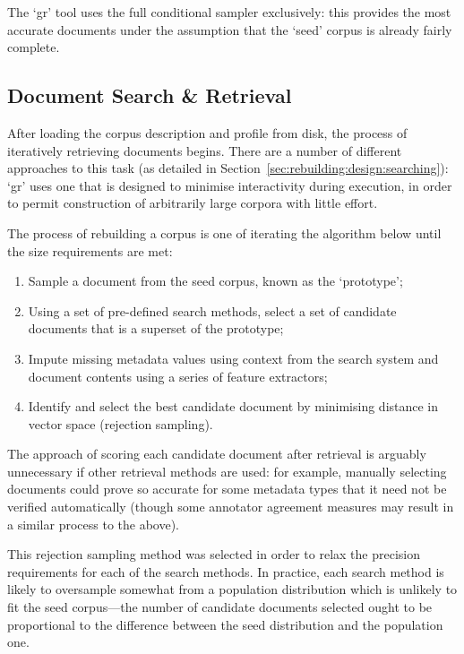 The `gr' tool uses the full conditional sampler exclusively: this provides the most accurate documents under the assumption that the `seed' corpus is already fairly complete.





\subsection{Document Search \& Retrieval}
After loading the corpus description and profile from disk, the process of iteratively retrieving documents begins.  There are a number of different approaches to this task (as detailed in Section~\ref{sec:rebuilding:design:searching}): `gr' uses one that is designed to minimise interactivity during execution, in order to permit construction of arbitrarily large corpora with little effort.

The process of rebuilding a corpus is one of iterating the algorithm below until the size requirements are met:

\begin{enumerate}
    \item Sample a document from the seed corpus, known as the `prototype';
    \item Using a set of pre-defined search methods, select a set of candidate documents that is a superset of the prototype;
    \item Impute missing metadata values using context from the search system and document contents using a series of feature extractors;
    \item Identify and select the best candidate document by minimising distance in vector space (rejection sampling).
\end{enumerate}

The approach of scoring each candidate document after retrieval is arguably unnecessary if other retrieval methods are used: for example, manually selecting documents could prove so accurate for some metadata types that it need not be verified automatically (though some annotator agreement measures may result in a similar process to the above).

This rejection sampling method was selected in order to relax the precision requirements for each of the search methods.  In practice, each search method is likely to oversample somewhat from a population distribution which is unlikely to fit the seed corpus---the number of candidate documents selected ought to be proportional to the difference between the seed distribution and the population one.

